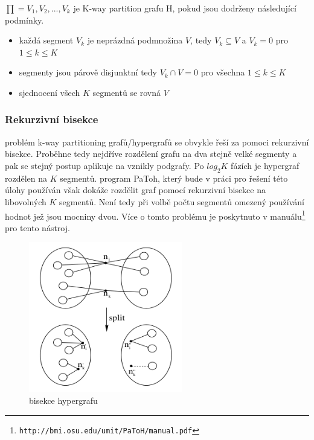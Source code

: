 \documentclass[thesis=M,czech]{FITthesis}[2012/06/26]
\begin{document}
\medskip
$\prod = {V_1, V_2, ..., V_k} $ je K-way partition grafu H, pokud jsou dodrženy následující podmínky.
\begin{itemize}
\item každá segment $V_k$ je neprázdná podmnožina $V$, tedy $V_k \subseteq V$ a $V_k = 0$ pro $1 \leq k \leq K$
\item segmenty jsou párově disjunktní tedy $V_k \cap V = 0 $ pro všechna $1 \leq k \leq K$
\item sjednocení všech $K$ segmentů se rovná $V$
\end{itemize}

\subsubsection{Rekurzivní bisekce}
problém k-way partitioning grafů/hypergrafů se obvykle řeší za pomoci rekurzivní bisekce. Proběhne tedy nejdříve rozdělení grafu na dva stejně velké segmenty a pak se stejný postup aplikuje na vznikly podgrafy. Po $log_2K$ fázích je hypergraf rozdělen na $K$ segmentů. program PaToh, který bude v práci pro řešení této úlohy používán však dokáže rozdělit graf pomocí rekurzivní bisekce na libovolných $K$ segmentů. Není tedy při volbě počtu segmentů omezený používání hodnot jež jsou mocniny dvou. Více o tomto problému je poskytnuto v manuálu\footnote{\texttt{http://bmi.osu.edu/umit/PaToH/manual.pdf}} pro tento nástroj. 




\begin{figure}\centering
	\includegraphics[width=0.6\textwidth, angle=0]{files/bisection.png}
	\caption[bisekce hypergrafu]{bisekce hypergrafu}\label{figbisection}
\end{figure}
\end{document}
